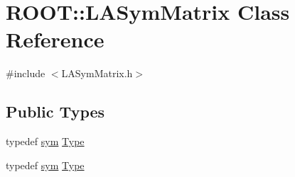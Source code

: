 \hypertarget{classROOT_1_1Minuit2_1_1LASymMatrix}{}\section{R\+O\+OT\+:\+:L\+A\+Sym\+Matrix Class Reference}
\label{classROOT_1_1Minuit2_1_1LASymMatrix}


{\ttfamily \#include $<$L\+A\+Sym\+Matrix.\+h$>$}

\subsection*{Public Types}
\begin{DoxyCompactItemize}
\item 
typedef \mbox{\hyperlink{classROOT_1_1Minuit2_1_1sym}{sym}} \mbox{\hyperlink{classROOT_1_1Minuit2_1_1LASymMatrix_a339ed010f480472ba1029aef21c149ea}{Type}}
\item 
typedef \mbox{\hyperlink{classROOT_1_1Minuit2_1_1sym}{sym}} \mbox{\hyperlink{classROOT_1_1Minuit2_1_1LASymMatrix_a339ed010f480472ba1029aef21c149ea}{Type}}
\end{DoxyCompactItemize}
